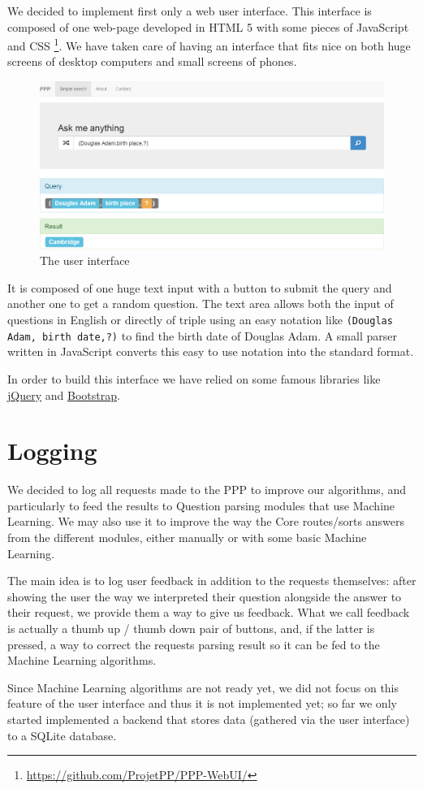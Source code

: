 We decided to implement first only a web user interface. This interface
is composed of one web-page developed in HTML 5 with some
pieces of JavaScript and CSS \footnote{\url{https://github.com/ProjetPP/PPP-WebUI/}}.
We have taken care of having an
interface that fits nice on both huge screens of desktop computers
and small screens of phones.

\begin{figure}[!ht]
    \centering
    \includegraphics[scale=0.35]{WebUI.png}
    \caption{The user interface}
\end{figure}

It is composed of one huge text input with a button to submit
the query and another one to get a random question. The text area
allows both the input of questions in English or directly of triple using
an easy notation like \texttt{(Douglas Adam, birth date,?)} to find the
birth date of Douglas Adam. A small parser written in JavaScript converts
this easy to use notation into the standard format.

In order to build this interface we have relied on some famous libraries 
like \href{http://jquery.com/}{jQuery} and \href{http://getbootstrap.com/}{Bootstrap}.

\section{Logging}

We decided to log all requests made to the PPP to improve our algorithms,
and particularly to feed the results to Question parsing
modules that use Machine Learning.
We may also use it to improve the way the Core routes/sorts answers
from the different modules, either manually or with some basic
Machine Learning.

The main idea is to log user feedback in addition to the requests
themselves: after showing the user the way we interpreted their
question alongside the answer to their request, we provide them a
way to give us feedback.
What we call feedback is actually a thumb up / thumb down pair of
buttons, and, if the latter is pressed, a way to correct the requests
parsing result so it can be fed to the Machine Learning algorithms.

Since Machine Learning algorithms are not ready yet, we did not focus
on this feature of the user interface and thus it is not implemented yet;
so far we only started implemented a backend that stores data
(gathered via the user interface) to a SQLite database.

